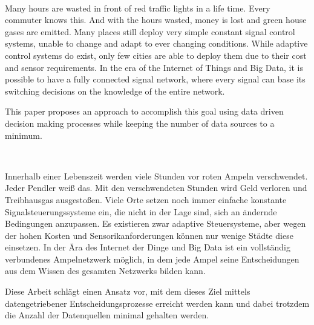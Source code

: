 \vspace{3cm}
\begingroup
{}\\
\endgroup
\vspace{1.5cm}

Many hours are wasted in front of red traffic lights in a life time. Every commuter knows this. And with the hours wasted, money is lost and green house gases are emitted. Many places still deploy very simple constant signal control systems, unable to change and adapt to ever changing conditions. While adaptive control systems do exist, only few cities are able to deploy them due to their cost and sensor requirements. In the era of the Internet of Things and Big Data, it is possible to have a fully connected signal network, where every signal can base its switching decisions on the knowledge of the entire network.

This paper proposes an approach to accomplish this goal using data driven decision making processes while keeping the number of data sources to a minimum.


\vspace{1.5cm}
\begingroup
{}\\
\endgroup
\vspace{1.5cm}

Innerhalb einer Lebenszeit werden viele Stunden vor roten Ampeln verschwendet. Jeder Pendler weiß das. Mit den verschwendeten Stunden wird Geld verloren und Treibhausgas ausgestoßen. Viele Orte setzen noch immer einfache konstante Signalsteuerungssysteme ein, die nicht in der Lage sind, sich an ändernde Bedingungen anzupassen. Es existieren zwar adaptive Steuersysteme, aber wegen der hohen Kosten und Sensorikanforderungen können nur wenige Städte diese einsetzen. In der Ära des Internet der Dinge und Big Data ist ein vollständig verbundenes Ampelnetzwerk möglich, in dem jede Ampel seine Entscheidungen aus dem Wissen des gesamten Netzwerks bilden kann.

Diese Arbeit schlägt einen Ansatz vor, mit dem dieses Ziel mittels datengetriebener Entscheidungsprozesse erreicht werden kann und dabei trotzdem die Anzahl der Datenquellen minimal gehalten werden.
